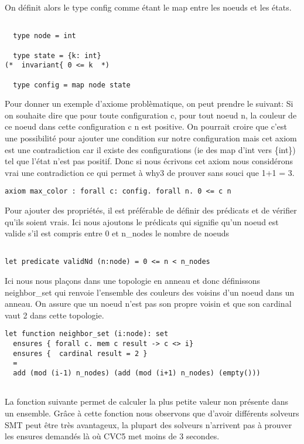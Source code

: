 \documentclass[11pt]{article}
\begin{document}
On définit alors le type config comme étant le map entre les noeuds et les états.


\begin{verbatim}

  type node = int

  type state = {k: int}
(*  invariant{ 0 <= k  *)

  type config = map node state

\end{verbatim}

Pour donner un exemple d'axiome problèmatique, on peut prendre le suivant: 
Si on souhaite dire que pour toute configuration c, pour tout noeud n, la couleur de ce noeud dans cette configuration c n est positive. 
On pourrait croire que c'est une possibilité pour ajouter une condition sur notre configuration mais cet axiom est une contradiction car il existe des configurations (ie des map d'int vers \{int\})
tel que l'état n'est pas positif.
Donc si nous écrivons cet axiom nous considérons vrai une contradiction ce qui permet à why3 de prouver sans souci que 1+1 = 3.

\begin{verbatim}
axiom max_color : forall c: config. forall n. 0 <= c n
\end{verbatim}


Pour ajouter des propriétés, il est préférable de définir des prédicats et de vérifier qu'ils soient vrais. 
Ici nous ajoutons le prédicats qui signifie qu'un noeud est valide s'il est compris entre 0 et n\_nodes le nombre de noeuds
\begin{verbatim}

let predicate validNd (n:node) = 0 <= n < n_nodes

\end{verbatim}

Ici nous nous plaçons dans une topologie en anneau et donc définissons neighbor\_set qui renvoie l'ensemble des couleurs des voisins d'un 
noeud dans un anneau. 
On assure que un noeud n'est pas son propre voisin et que son cardinal vaut 2 dans cette topologie.

\begin{verbatim}
let function neighbor_set (i:node): set
  ensures { forall c. mem c result -> c <> i}
  ensures {  cardinal result = 2 } 
  =
  add (mod (i-1) n_nodes) (add (mod (i+1) n_nodes) (empty()))


\end{verbatim}


La fonction suivante permet de calculer la plus petite valeur non présente dans un ensemble. 
Grâce à cette fonction nous observons que d'avoir différents solveurs SMT peut être très avantageux, la plupart des solveurs n'arrivent pas à prouver
les ensures demandés là où CVC5 met moins de 3 secondes.
\end{document}
